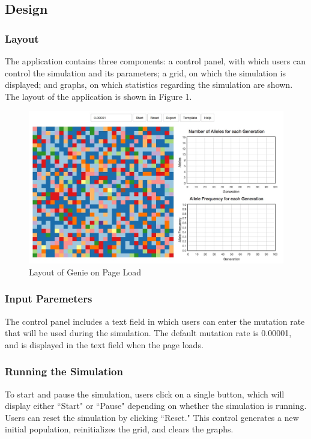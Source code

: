 \documentclass[12pt]{article}
\begin{document}
\begin{spacing}{1.6}
\subsection{Design}

\subsubsection{Layout}
The application contains three components: a control panel, with which users can control the simulation and its parameters; a grid, on which the simulation is displayed; and graphs, on which statistics regarding the simulation are shown. The layout of the application is shown in Figure 1.
\begin{figure}[h]
\caption{Layout of Genie on Page Load}
\centering
\includegraphics[scale=0.4]{layout}
\end{figure}

\subsubsection{Input Paremeters}
The control panel includes a text field in which users can enter the mutation rate that will be used during the simulation. The default mutation rate is 0.00001, and is displayed in the text field when the page loads.

\subsubsection{Running the Simulation}
To start and pause the simulation, users click on a single button, which will display either ``Start" or ``Pause" depending on whether the simulation is running. Users can reset the simulation by clicking ``Reset." This control generates a new initial population, reinitializes the grid, and clears the graphs.


\end{spacing}
\end{document}
